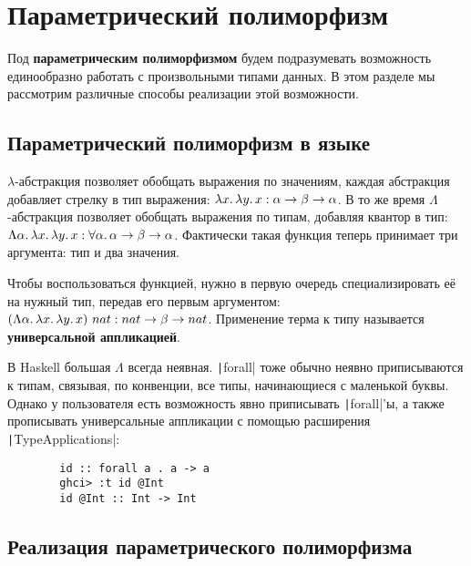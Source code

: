 \documentclass[12pt]{article}
\newcommand{\vocab}[1]{\textbf{#1}} %
\newcommand{\ap}{~}
\begin{document}


    \section{Параметрический полиморфизм}

    Под \vocab{параметрическим полиморфизмом} будем подразумевать возможность единообразно работать с произвольными типами данных.
    В этом разделе мы рассмотрим различные способы реализации этой возможности.

    \subsection{Параметрический полиморфизм в языке}

    $\lambda$-абстракция позволяет обобщать выражения по значениям, каждая абстракция добавляет стрелку в тип выражения: $\lambda x\ldotp \lambda y\ldotp x : \alpha\to\beta\to\alpha$.
    В то же время $\Lambda$-абстракция позволяет обобщать выражения по типам, добавляя квантор в тип: $\Lambda \alpha\ldotp\lambda x\ldotp \lambda y\ldotp x : \forall \alpha\ldotp \alpha\to\beta\to\alpha$.
    Фактически такая функция теперь принимает три аргумента: тип и два значения.

    Чтобы воспользоваться функцией, нужно в первую очередь специализировать её на нужный тип, передав его первым аргументом: $(\Lambda \alpha\ldotp\lambda x\ldotp \lambda y\ldotp x)\ap nat : nat\to\beta\to nat$.
    Применение терма к типу называется \vocab{универсальной аппликацией}.

    В Haskell большая $\Lambda$ всегда неявная.
    \texttt|forall| тоже обычно неявно приписываются к типам, связывая, по конвенции, все типы, начинающиеся с маленькой буквы.
    Однако у пользователя есть возможность явно приписывать \texttt|forall|'ы, а также прописывать универсальные аппликации с помощью расширения \texttt|TypeApplications|:
    \begin{verbatim}
        id :: forall a . a -> a
        ghci> :t id @Int
        id @Int :: Int -> Int
    \end{verbatim}


    \subsection{Реализация параметрического полиморфизма}
\end{document}

